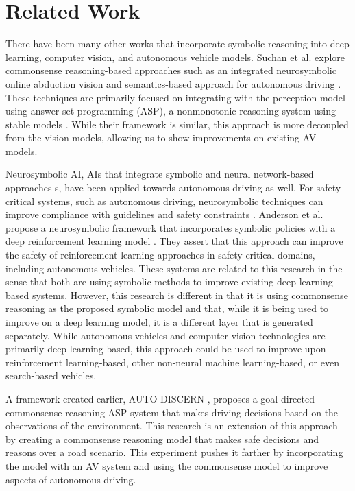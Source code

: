 \section{Related Work}
There have been many other works that incorporate symbolic reasoning into deep learning, computer vision, and autonomous vehicle models. Suchan et al. explore commonsense reasoning-based approaches such as an integrated neurosymbolic online abduction vision and semantics-based approach for autonomous driving \cite{suchan2021commonsense, suchan2020driven}. These techniques are primarily focused on integrating with the perception model using answer set programming (ASP), a nonmonotonic reasoning system using stable models \cite{gelfond2014knowledge,lifschitz2019answer}. While their framework is similar, this approach is more decoupled from the vision models, allowing us to show improvements on existing AV models.

Neurosymbolic AI, AIs that integrate symbolic and neural network-based approaches \cite{hitzler2022neuro}s, have been applied towards autonomous driving as well. For safety-critical systems, such as autonomous driving, neurosymbolic techniques can improve compliance with guidelines and safety constraints \cite{sheth2023neurosymbolic}. Anderson et al. propose a neurosymbolic framework that incorporates symbolic policies with a deep reinforcement learning model \cite{anderson2020neurosymbolic}. They assert that this approach can improve the safety of reinforcement learning approaches in safety-critical domains, including autonomous vehicles. These systems are related to this research in the sense that both are using symbolic methods to improve existing deep learning-based systems. However, this research is different in that it is using commonsense reasoning as the proposed symbolic model and that, while it is being used to improve on a deep learning model, it is a different layer that is generated separately. While autonomous vehicles and computer vision technologies are primarily deep learning-based, this approach could be used to improve upon reinforcement learning-based, other non-neural machine learning-based, or even search-based vehicles.

A framework created earlier, AUTO-DISCERN \cite{kothawade2021auto}, proposes a goal-directed commonsense reasoning ASP system that makes driving decisions based on the observations of the environment. This research is an extension of this approach by creating a commonsense reasoning model that makes safe decisions and reasons over a road scenario. This experiment pushes it farther by incorporating the model with an AV system and using the commonsense model to improve aspects of autonomous driving.